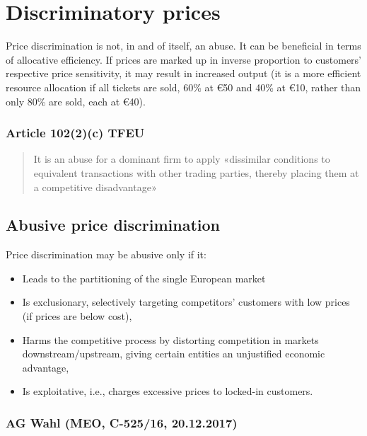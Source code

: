 \section{Discriminatory prices}

    Price discrimination is not, in and of itself, an abuse. It can be beneficial in terms of allocative efficiency. If prices are marked up in inverse proportion to customers’ respective price sensitivity, it may result in increased output (it is a more efficient resource allocation if all tickets are sold, 60\% at €50 and 40\% at €10, rather than only 80\% are sold, each at €40).

        \subsubsection{Article 102(2)(c) TFEU}

            \begin{quote}
                It is an abuse for a dominant firm to apply «dissimilar conditions to equivalent transactions with other trading parties, thereby placing them at a competitive disadvantage»
            \end{quote}
            
    \subsection{Abusive price discrimination}

Price discrimination may be abusive only if it:

    \begin{itemize}
        \item Leads to the partitioning of the single European market
        \item Is exclusionary, selectively targeting competitors’ customers with low prices (if prices are below cost),
        \item Harms the competitive process by distorting competition in markets downstream/upstream, giving certain entities an unjustified economic advantage,
        \item Is exploitative, i.e., charges excessive prices to locked-in customers.
    \end{itemize}

        \subsubsection{AG Wahl (MEO, C-525/16, 20.12.2017)}

